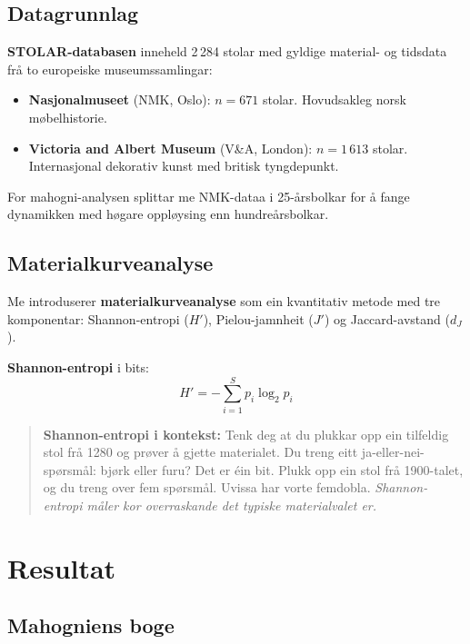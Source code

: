\documentclass[10pt, a4paper, twocolumn]{article}
\begin{document}
\subsection{Datagrunnlag}

\textbf{STOLAR-databasen} \citep{finne2026} inneheld 2\,284 stolar med gyldige material- og tidsdata frå to europeiske museumssamlingar:

\begin{itemize}
  \item \textbf{Nasjonalmuseet} (NMK, Oslo): $n = 671$ stolar. Hovudsakleg norsk møbelhistorie.
  \item \textbf{Victoria and Albert Museum} (V\&A, London): $n = 1\,613$ stolar. Internasjonal dekorativ kunst med britisk tyngdepunkt.
\end{itemize}

For mahogni-analysen splittar me NMK-dataa i 25-årsbolkar for å fange dynamikken med høgare oppløysing enn hundreårsbolkar.

\subsection{Materialkurveanalyse}

Me introduserer \textbf{materialkurveanalyse} som ein kvantitativ metode med tre komponentar: Shannon-entropi ($H'$), Pielou-jamnheit ($J'$) og Jaccard-avstand ($d_J$).

\textbf{Shannon-entropi} \citep{shannon1948} i bits:
\begin{equation}
  H' = -\sum_{i=1}^{S} p_i \log_2 p_i
\end{equation}

\begin{quote}
\textbf{Shannon-entropi i kontekst:} Tenk deg at du plukkar opp ein tilfeldig stol frå 1280 og prøver å gjette materialet. Du treng eitt ja-eller-nei-spørsmål: bjørk eller furu? Det er éin bit. Plukk opp ein stol frå 1900-talet, og du treng over fem spørsmål. Uvissa har vorte femdobla. \emph{Shannon-entropi måler kor overraskande det typiske materialvalet er.}
\end{quote}


\section{Resultat}

\subsection{Mahogniens boge}
\end{document}
